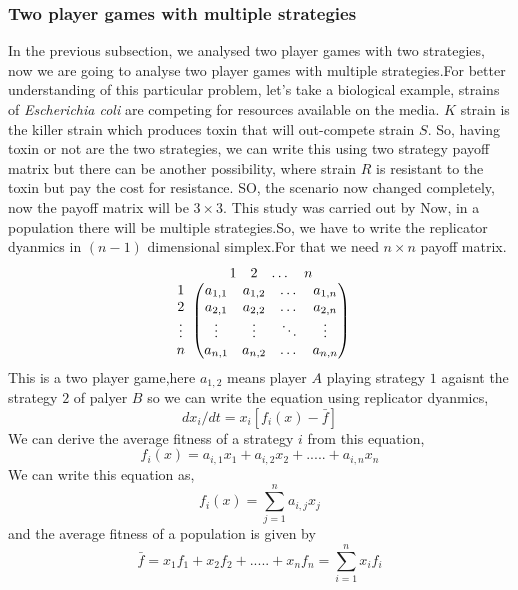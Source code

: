 \documentclass{article}
\begin{document}
\subsubsection{Two player games with multiple strategies}
In the previous subsection, we analysed two player games with two strategies, now we are going to analyse two player games with multiple strategies.For better understanding of this particular problem, let's take a biological example, strains of \textit{Escherichia coli} are competing for resources available on the media. $K$ strain is the killer strain which produces toxin that will out-compete strain $S$. So, having toxin or not are the two strategies, we can write this using two strategy payoff matrix but there can be another possibility, where strain $R$ is resistant to the toxin but pay the cost for resistance. SO, the scenario now changed completely, now the payoff matrix will be $3 \times 3$. This study was carried out by\cite{Kerr2002}\cite{Czaran2002}
Now, in a population there will be multiple strategies.So, we have to write the replicator dyanmics in $(n-1)$ dimensional simplex.For that we need $n\times n$ payoff matrix.
\[
\begin{array}{c@{}c}
   & \begin{array}{cccc} 1 & 2 & \dots & n \end{array} \\ 
   \begin{array}{c} 
       1 \\ 
       2 \\ 
       \vdots \\ 
       n 
   \end{array} 
   & 
   \begin{pmatrix}
       a_{1,1} & a_{1,2} & \dots & a_{1,n} \\
       a_{2,1} & a_{2,2} & \dots & a_{2,n} \\
       \vdots & \vdots & \ddots & \vdots \\
       a_{n,1} & a_{n,2} & \dots & a_{n,n}
   \end{pmatrix}
\end{array}
\]
This is a two player game,here $a_{1,2}$ means player $A$ playing strategy $1$ agaisnt the strategy $2$ of palyer $B$ so we can write the equation using replicator dyanmics,
\[dx_i/dt=x_i[f_i(x)-\bar{f}]\]
We can derive the average fitness of a strategy $i$ from this equation,
\[f_i(x)=a_{i,1}x_1+a_{i,2}x_2+.....+a_{i,n}x_n\]
We can write this equation as,
\[f_i(x)=\sum_{j=1}^{n}a_{i,j}x_j\]
and the average fitness of a population is given by
\[\bar{f}=x_1f_1+x_2f_2+.....+x_nf_n= \sum_{i=1}^{n}x_if_i \]
\end{document}
